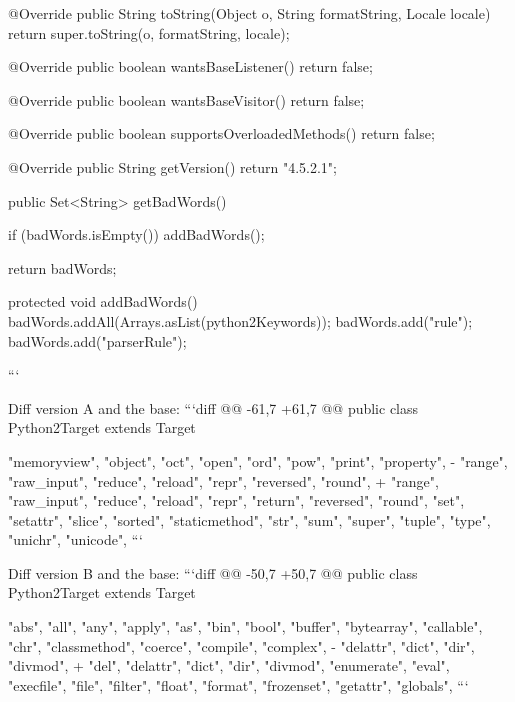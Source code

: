 \begin{prompt}
{{      @Override
      public String toString(Object o, String formatString, Locale locale) {
        return super.toString(o, formatString, locale);
      }
    }
  
    @Override
    public boolean wantsBaseListener() {
      return false;
    }
  
    @Override
    public boolean wantsBaseVisitor() {
      return false;
    }
  
    @Override
    public boolean supportsOverloadedMethods() {
      return false;
    }
  
    @Override
    public String getVersion() {
      return "4.5.2.1";
    }
  
    public Set<String> getBadWords() {
      if (badWords.isEmpty()) {
        addBadWords();
      }
  
      return badWords;
    }
  
    protected void addBadWords() {
      badWords.addAll(Arrays.asList(python2Keywords));
      badWords.add("rule");
      badWords.add("parserRule");
    }
  }
  ```
  
  Diff version A and the base:
  ```diff
  @@ -61,7 +61,7 @@ public class Python2Target extends Target {
                  "memoryview",
                  "object", "oct", "open", "ord",
                  "pow", "print", "property",
  -               "range", "raw_input", "reduce", "reload", "repr", "reversed", "round",
  +               "range", "raw_input", "reduce", "reload", "repr", "return", "reversed", "round",
                  "set", "setattr", "slice", "sorted", "staticmethod", "str", "sum", "super",
                  "tuple", "type",
                  "unichr", "unicode",
  ```
  
  Diff version B and the base:
  ```diff
  @@ -50,7 +50,7 @@ public class Python2Target extends Target {
                  "abs", "all", "any", "apply", "as",
                  "bin", "bool", "buffer", "bytearray",
                  "callable", "chr", "classmethod", "coerce", "compile", "complex",
  -               "delattr", "dict", "dir", "divmod",
  +               "del", "delattr", "dict", "dir", "divmod",
                  "enumerate", "eval", "execfile",
                  "file", "filter", "float", "format", "frozenset",
                  "getattr", "globals",
  ```
  
}}
\end{prompt}
